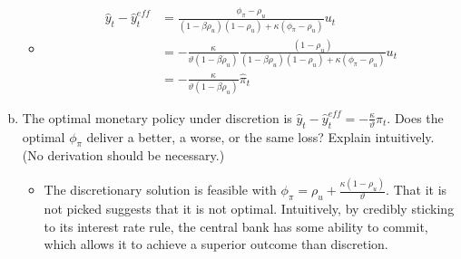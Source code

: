 \documentclass{article}
\newcommand{\1}{\mathbf{1}}
\begin{document}
\begin{enumerate}[(a)]
\begin{itemize}
	\item 
	\begin{align*}
	\hat{y}_{t}-\hat{y}_{t}^{eff}&= \frac{\phi_\pi-\rho_u}{(1-\beta\rho_u)(1-\rho_u) +\kappa(\phi_\pi-\rho_u)}u_t \\
	&=-\frac{\kappa }{\vartheta(1-\beta\rho_u)}\frac{(1-\rho_u)}{(1-\beta\rho_u)(1-\rho_u) +\kappa(\phi_\pi-\rho_u)}u_t \\
	&=-\frac{\kappa }{\vartheta(1-\beta\rho_u)}\hat{\pi}_t
\end{align*}
\end{itemize}
\item The optimal monetary policy under discretion is $\hat{y}_{t}-\hat{y}_{t}^{eff}=-\frac{\kappa}{\vartheta}\hat{\pi}_t$. Does the optimal $\phi_\pi$ deliver a better, a worse, or the same loss? Explain intuitively. (No derivation should be necessary.)
\begin{itemize}
	\item The discretionary solution is feasible with $\phi_\pi=\rho_u + \frac{\kappa (1-\rho_u)}{\vartheta}$. That it is not picked suggests that it is not optimal. Intuitively, by credibly sticking to its interest rate rule, the central bank has some ability to commit, which allows it to achieve a superior outcome than discretion. 
\end{itemize}
\end{enumerate}
\end{document}
